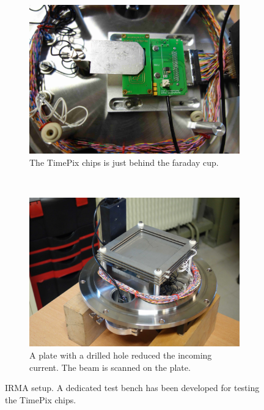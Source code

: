 \begin{figure}[!ht]
	\begin{subfigure}[t]{0.5\textwidth}
		\includegraphics[width=\textwidth]{04_IPHI_Test/figures/fig000_IRMA_setup01}
		\caption{The TimePix chips is just behind the faraday cup.}
		\label{}
	\end{subfigure}
	~
	\begin{subfigure}[t]{0.5\textwidth}
		\includegraphics[width=\textwidth]{04_IPHI_Test/figures/fig000_IRMA_setup02}
		\caption{A plate with a drilled hole reduced the incoming current. The beam is scanned on the plate.}
		\label{}
	\end{subfigure}
	\caption[IRMA setup]{IRMA setup. A dedicated test bench has been developed for testing the TimePix chips.}
	\label{chap4:IRMA_setup}
\end{figure}
